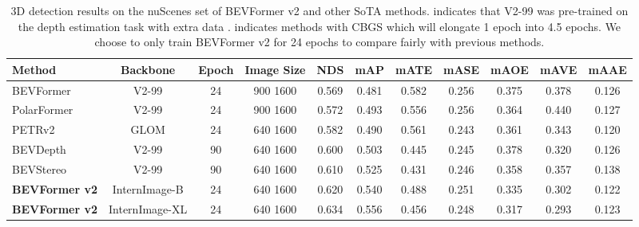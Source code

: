 \documentclass[10pt,twocolumn,letterpaper]{article}
\begin{document}
\setlength{\tabcolsep}{3pt}
\setlength{\doublerulesep}{2\arrayrulewidth}
\renewcommand{\arraystretch}{1.1}
\begin{table*}[t]
    \caption{3D detection results on the nuScenes  set of BEVFormer v2 and other SoTA methods. indicates that V2-99 \cite{Vovnet} was pre-trained on the depth estimation task with extra data \cite{DD3D}.  indicates methods with CBGS which will elongate 1 epoch into 4.5 epochs. We choose to only train BEVFormer v2 for 24 epochs to compare fairly with previous methods.}
    \label{table:sota_nuscenes}
    \centering

    \begin{tabular}{l|c|c|c|cc|ccccc}
        \toprule
        Method & Backbone & Epoch & Image Size & NDS & mAP & mATE & mASE & mAOE & mAVE & mAAE \\ 
        \midrule
        BEVFormer~\cite{bevformer} & V2-99 & 24 & 900  1600 & 0.569 & 0.481 & 0.582 & 0.256 & 0.375 & 0.378 & 0.126 \\
        PolarFormer~\cite{polarformer} & V2-99 & 24 & 900  1600 & 0.572 & 0.493 & 0.556 & 0.256 & 0.364 & 0.440 & 0.127 \\
        PETRv2~\cite{petrv2} & GLOM & 24 & 640  1600 & 0.582 & 0.490 & 0.561 & 0.243 & 0.361 & 0.343 & 0.120 \\
        BEVDepth~\cite{bevdepth} & V2-99 & 90 & 640  1600 & 0.600 & 0.503 & 0.445 & 0.245 & 0.378 & 0.320 & 0.126 \\
        BEVStereo~\cite{bevstereo} & V2-99 & 90 & 640  1600 & 0.610 & 0.525 & 0.431 & 0.246 & 0.358 & 0.357 & 0.138 \\
        \midrule
        \textbf{BEVFormer v2} & InternImage-B & 24 & 640  1600 & 0.620 & 0.540 & 0.488 & 0.251 & 0.335 & 0.302 & 0.122 \\
        \textbf{BEVFormer v2} & InternImage-XL & 24 & 640  1600 & 0.634 & 0.556 & 0.456 & 0.248 & 0.317 & 0.293 & 0.123 \\
        \bottomrule
    \end{tabular}

\end{table*} \setlength{\tabcolsep}{3pt}
\setlength{\doublerulesep}{2\arrayrulewidth}
\renewcommand{\arraystretch}{1.1}
\end{document}
